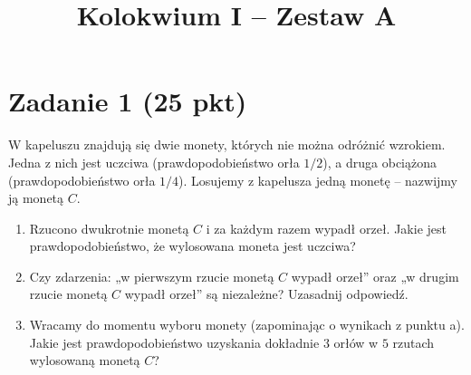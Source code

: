 \documentclass[polish, 10pt]{extarticle}
\begin{document}
\title{Kolokwium I -- Zestaw A}
\author{}
\date{}

\maketitle
\vspace{-2cm}

\section*{Zadanie 1 (25 pkt)}

W kapeluszu znajdują się dwie monety, których nie można odróżnić wzrokiem. Jedna z nich jest uczciwa (prawdopodobieństwo orła $1/2$), a druga obciążona (prawdopodobieństwo orła $1/4$). Losujemy z kapelusza jedną monetę – nazwijmy ją monetą $C$.
\begin{enumerate}
\item Rzucono dwukrotnie monetą $C$ i za każdym razem wypadł orzeł. Jakie jest prawdopodobieństwo, że wylosowana moneta jest uczciwa?
\item Czy zdarzenia: „w pierwszym rzucie monetą $C$ wypadł orzeł” oraz „w drugim rzucie monetą $C$ wypadł orzeł” są niezależne? Uzasadnij odpowiedź.
\item Wracamy do momentu wyboru monety (zapominając o wynikach z punktu a). Jakie jest prawdopodobieństwo uzyskania dokładnie $3$ orłów w $5$ rzutach wylosowaną monetą $C$?
\end{enumerate}
\end{document}
